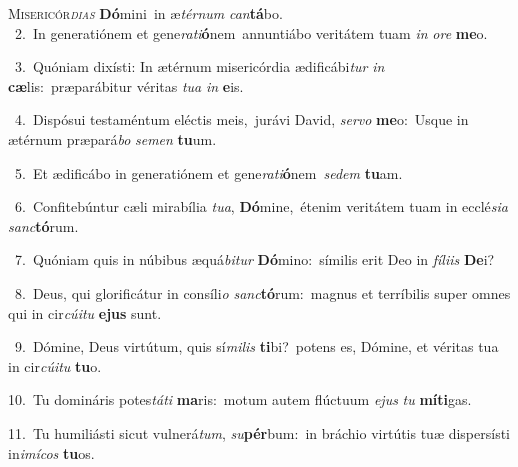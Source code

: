 \lettrine{\initial\textcolor{\initialcolor}{M}}{isericór\-\textit{di}\-\textit{as}} \textbf{Dó}\-mini~\star in æ\-\textit{tér}\-\textit{num} \textit{can}\-\textbf{tá}bo.\\
{\numbfont\textcolor{\numbcolor}{~2.}}~In generatiónem et gene\-\textit{ra}\-\textit{ti}\textbf{ó}nem~\star annuntiábo veritátem tuam \textit{in} \textit{o}\-\textit{re} \textbf{me}\-o.\par
{\numbfont\textcolor{\numbcolor}{~3.}}~Quóniam dixísti: In ætérnum misericórdia ædificábi\textit{tur} \textit{in} \textbf{cæ}\-lis:~\star præparábitur véritas \textit{tu}\-\textit{a} \textit{in} \textbf{e}\-is.\par
{\numbfont\textcolor{\numbcolor}{~4.}}~Dispósui testaméntum eléctis meis,~\dagger jurávi David, \textit{ser}\-\textit{vo} \textbf{me}\-o:~\star Usque in ætérnum præpará\textit{bo} \textit{se}\-\textit{men} \textbf{tu}\-um.\par
{\numbfont\textcolor{\numbcolor}{~5.}}~Et ædificábo in generatiónem et gene\-\textit{ra}\-\textit{ti}\textbf{ó}nem~\star \textit{se}\-\textit{dem} \textbf{tu}\-am.\par
{\numbfont\textcolor{\numbcolor}{~6.}}~Confitebúntur cæli mirabília \textit{tu}\-\textit{a}, \textbf{Dó}\-mine,~\star étenim veritátem tuam in ecclé\-\textit{si}\-\textit{a} \textit{sanc}\-\textbf{tó}rum.\par
{\numbfont\textcolor{\numbcolor}{~7.}}~Quóniam quis in núbibus æquá\-\textit{bi}\-\textit{tur} \textbf{Dó}\-mino:~\star símilis erit Deo in \textit{fí}\-\textit{li}\textit{is} \textbf{De}\-i?\par
{\numbfont\textcolor{\numbcolor}{~8.}}~Deus, qui glorificátur in consíli\textit{o} \textit{sanc}\-\textbf{tó}rum:~\star magnus et terríbilis super omnes qui in cir\-\textit{cú}\-\textit{i}\textit{tu} \textbf{e}\-\textbf{jus} sunt.\par
{\numbfont\textcolor{\numbcolor}{~9.}}~Dómine, Deus virtútum, quis sí\-\textit{mi}\-\textit{lis} \textbf{ti}\-bi?~\star potens es, Dómine, et véritas tua in cir\-\textit{cú}\-\textit{i}\textit{tu} \textbf{tu}\-o.\par
{\numbfont\textcolor{\numbcolor}{10.}}~Tu domináris potes\-\textit{tá}\-\textit{ti} \textbf{ma}\-ris:~\star motum autem flúctuum \textit{e}\-\textit{jus} \textit{tu} \textbf{mí}\-\textbf{ti}gas.\par
{\numbfont\textcolor{\numbcolor}{11.}}~Tu humiliásti sicut vulnerá\-\textit{tum}\-, \textit{su}\-\textbf{pér}bum:~\star in bráchio virtútis tuæ dispersísti in\-\textit{i}\-\textit{mí}\textit{cos} \textbf{tu}\-os.\par
